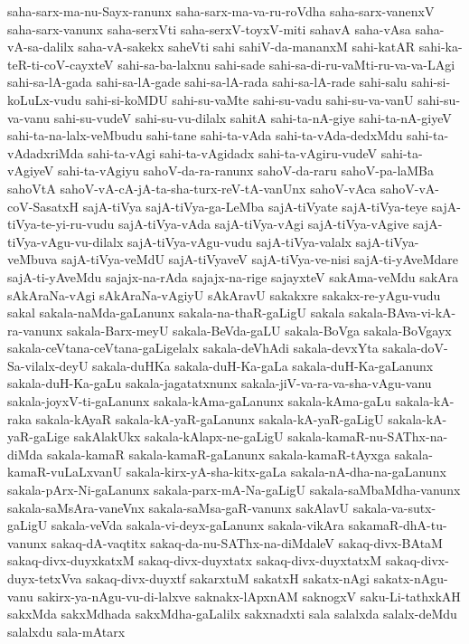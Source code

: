 {saha-sarx-ma-nu-Sayx-ranunx
saha-sarx-ma-va-ru-roVdha
saha-sarx-vanenxV
saha-sarx-vanunx
saha-serxVti
saha-serxV-toyxV-miti
sahavA
saha-vAsa
saha-vA-sa-dalilx
saha-vA-sakekx
saheVti
sahi
sahiV-da-mananxM
sahi-katAR
sahi-ka-teR-ti-coV-cayxteV
sahi-sa-ba-lalxnu
sahi-sade
sahi-sa-di-ru-vaMti-ru-va-va-LAgi
sahi-sa-lA-gada
sahi-sa-lA-gade
sahi-sa-lA-rada
sahi-sa-lA-rade
sahi-salu
sahi-si-koLuLx-vudu
sahi-si-koMDU
sahi-su-vaMte
sahi-su-vadu
sahi-su-va-vanU
sahi-su-va-vanu
sahi-su-vudeV
sahi-su-vu-dilalx
sahitA
sahi-ta-nA-giye
sahi-ta-nA-giyeV
sahi-ta-na-lalx-veMbudu
sahi-tane
sahi-ta-vAda
sahi-ta-vAda-dedxMdu
sahi-ta-vAdadxriMda
sahi-ta-vAgi
sahi-ta-vAgidadx
sahi-ta-vAgiru-vudeV
sahi-ta-vAgiyeV
sahi-ta-vAgiyu
sahoV-da-ra-ranunx
sahoV-da-raru
sahoV-pa-laMBa
sahoVtA
sahoV-vA-cA-jA-ta-sha-turx-reV-tA-vanUnx
sahoV-vAca
sahoV-vA-coV-SasatxH
sajA-tiVya
sajA-tiVya-ga-LeMba
sajA-tiVyate
sajA-tiVya-teye
sajA-tiVya-te-yi-ru-vudu
sajA-tiVya-vAda
sajA-tiVya-vAgi
sajA-tiVya-vAgive
sajA-tiVya-vAgu-vu-dilalx
sajA-tiVya-vAgu-vudu
sajA-tiVya-valalx
sajA-tiVya-veMbuva
sajA-tiVya-veMdU
sajA-tiVyaveV
sajA-tiVya-ve-nisi
sajA-ti-yAveMdare
sajA-ti-yAveMdu
sajajx-na-rAda
sajajx-na-rige
sajayxteV
sakAma-veMdu
sakAra
sAkAraNa-vAgi
sAkAraNa-vAgiyU
sAkAravU
sakakxre
sakakx-re-yAgu-vudu
sakal
sakala-naMda-gaLanunx
sakala-na-thaR-gaLigU
sakala
sakala-BAva-vi-kA-ra-vanunx
sakala-Barx-meyU
sakala-BeVda-gaLU
sakala-BoVga
sakala-BoVgayx
sakala-ceVtana-ceVtana-gaLigelalx
sakala-deVhAdi
sakala-devxYta
sakala-doV-Sa-vilalx-deyU
sakala-duHKa
sakala-duH-Ka-gaLa
sakala-duH-Ka-gaLanunx
sakala-duH-Ka-gaLu
sakala-jagatatxnunx
sakala-jiV-va-ra-va-sha-vAgu-vanu
sakala-joyxV-ti-gaLanunx
sakala-kAma-gaLanunx
sakala-kAma-gaLu
sakala-kA-raka
sakala-kAyaR
sakala-kA-yaR-gaLanunx
sakala-kA-yaR-gaLigU
sakala-kA-yaR-gaLige
sakAlakUkx
sakala-kAlapx-ne-gaLigU
sakala-kamaR-nu-SAThx-na-diMda
sakala-kamaR
sakala-kamaR-gaLanunx
sakala-kamaR-tAyxga
sakala-kamaR-vuLaLxvanU
sakala-kirx-yA-sha-kitx-gaLa
sakala-nA-dha-na-gaLanunx
sakala-pArx-Ni-gaLanunx
sakala-parx-mA-Na-gaLigU
sakala-saMbaMdha-vanunx
sakala-saMsAra-vaneVnx
sakala-saMsa-gaR-vanunx
sakAlavU
sakala-va-sutx-gaLigU
sakala-veVda
sakala-vi-deyx-gaLanunx
sakala-vikAra
sakamaR-dhA-tu-vanunx
sakaq-dA-vaqtitx
sakaq-da-nu-SAThx-na-diMdaleV
sakaq-divx-BAtaM
sakaq-divx-duyxkatxM
sakaq-divx-duyxtatx
sakaq-divx-duyxtatxM
sakaq-divx-duyx-tetxVva
sakaq-divx-duyxtf
sakarxtuM
sakatxH
sakatx-nAgi
sakatx-nAgu-vanu
sakirx-ya-nAgu-vu-di-lalxve
saknakx-lApxnAM
saknogxV
saku-Li-tathxkAH
sakxMda
sakxMdhada
sakxMdha-gaLalilx
sakxnadxti
sala
salalxda
salalx-deMdu
salalxdu
sala-mAtarx
}
